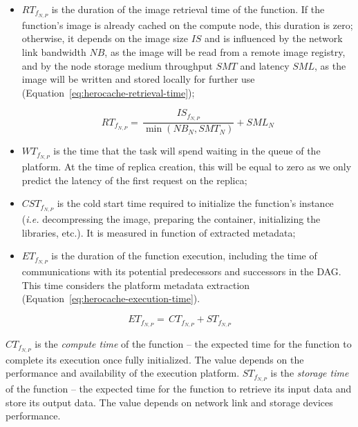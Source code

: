 \begin{itemize}
    \item ${RT}_{{f}_{N, P}}$ is the duration of the image retrieval time of the function. If the function's image is already cached on the compute node, this duration is zero; otherwise, it depends on the image size $IS$ and is influenced by the network link bandwidth $NB$, as the image will be read from a remote image registry, and by the node storage medium throughput $SMT$ and latency $SML$, as the image will be written and stored locally for further use (Equation~\ref{eq:herocache-retrieval-time});

    \begin{equation}
        {RT}_{{f}_{N, P}} = \, \frac{IS_{{f}_{N, P}}}{\min (NB_{N}, SMT_{N})} + SML_{N}
        \label{eq:herocache-retrieval-time}
    \end{equation}

    \item ${WT}_{{f}_{N, P}}$ is the time that the task will spend waiting in the queue of the platform. At the time of replica creation, this will be equal to zero as we only predict the latency of the first request on the replica;
    \item ${CST}_{{f}_{N, P}}$ is the cold start time required to initialize the function's instance (\textit{i.e.} decompressing the image, preparing the container, initializing the libraries, etc.). It is measured in function of extracted metadata;
    \item ${ET}_{{f}_{N, P}}$ is the duration of the function execution, including the time of communications with its potential predecessors and successors in the DAG. This time considers the platform metadata extraction (Equation~\ref{eq:herocache-execution-time}).
\end{itemize}

\begin{equation}
    {ET}_{{f}_{N, P}} = \, {CT}_{{f}_{N, P}} + {ST}_{{f}_{N, P}}
\label{eq:herocache-execution-time}
\end{equation}

${CT}_{{f}_{N, P}}$ is the \textit{compute time} of the function -- the expected time for the function to complete its execution once fully initialized. The value depends on the performance and availability of the execution platform. ${ST}_{{f}_{N, P}}$ is the \textit{storage time} of the function -- the expected time for the function to retrieve its input data and store its output data. The value depends on network link and storage devices performance.


